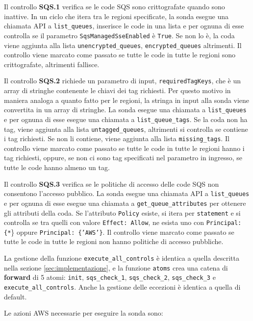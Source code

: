Il controllo \textbf{SQS.1} verifica se le code SQS sono crittografate quando sono inattive. In un ciclo che itera tra le regioni specificate, la sonda esegue una chiamata API a \texttt{list\_queues}, inserisce le code in una lista e per ognuna di esse controlla se il parametro \texttt{SqsManagedSseEnabled} è \texttt{True}. Se non lo è, la coda viene aggiunta alla lista \texttt{unencrypted\_queues}, \texttt{encrypted\_queues} altrimenti. Il controllo viene marcato come passato se tutte le code in tutte le regioni sono crittografate, altrimenti fallisce.

Il controllo \textbf{SQS.2} richiede un parametro di input, \texttt{requiredTagKeys}, che è un array di stringhe contenente le chiavi dei tag richiesti. Per questo motivo in maniera analoga a quanto fatto per le regioni, la stringa in input alla sonda viene convertita in un array di stringhe. La sonda esegue una chiamata a \texttt{list\_queues} e per ognuna di esse esegue una chiamata a \texttt{list\_queue\_tags}. Se la coda non ha tag, viene aggiunta alla lista \texttt{untagged\_queues}, altrimenti si controlla se contiene i tag richiesti. Se non li contiene, viene aggiunta alla lista \texttt{missing\_tags}. Il controllo viene marcato come passato se tutte le code in tutte le regioni hanno i tag richiesti, oppure, se non ci sono tag specificati nel parametro in ingresso, se tutte le code hanno almeno un tag.

Il controllo \textbf{SQS.3} verifica se le politiche di accesso delle code SQS non consentono l'accesso pubblico. La sonda esegue una chiamata API a \texttt{list\_queues} e per ognuna di esse esegue una chiamata a \texttt{get\_queue\_attributes} per ottenere gli attributi della coda. Se l'attributo \texttt{Policy} esiste, si itera per \texttt{statement} e si controlla se tra quelli con valore \texttt{Effect: Allow}, ne esista uno con \texttt{Principal: \{*}\} oppure \texttt{Principal: \{'AWS'\}}. Il controllo viene marcato come passato se tutte le code in tutte le regioni non hanno politiche di accesso pubbliche.

La gestione della funzione \texttt{execute\_all\_controls} è identica a quella descritta nella sezione \ref{sec:implementazione}, e la funzione \texttt{atoms} crea una catena di \textbf{forward} di 5 atomi: \texttt{init}, \texttt{sqs\_check\_1}, \texttt{sqs\_check\_2}, \texttt{sqs\_check\_3} e \texttt{execute\_all\_controls}. Anche la gestione delle eccezioni è identica a quella di default. 

Le azioni AWS necessarie per eseguire la sonda sono:

